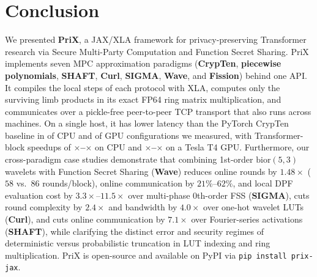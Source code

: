 \documentclass[11pt]{article}
\begin{document}
\section{Conclusion}
\label{sec:conclusion}

We presented \textbf{PriX}, a JAX/XLA framework for privacy-preserving Transformer research via Secure Multi-Party Computation and Function Secret Sharing. PriX implements seven MPC approximation paradigms (\textbf{CrypTen}, \textbf{piecewise polynomials}, \textbf{SHAFT}, \textbf{Curl}, \textbf{SIGMA}, \textbf{Wave}, and \textbf{Fission}) behind one API. It compiles the local steps of each protocol with XLA, computes only the surviving limb products in its exact FP64 ring matrix multiplication, and communicates over a pickle-free peer-to-peer TCP transport that also runs across machines. On a single host, it has lower latency than the PyTorch CrypTen baseline in \cpuNumFaster{} of \cpuNumConfigs{} CPU and \gpuNumFaster{} of \gpuNumConfigs{} GPU configurations we measured, with Transformer-block speedups of \textbf{\cpuLlmSpeedupMin$\times$--\cpuLlmSpeedupMax$\times$} on CPU and \textbf{\gpuLlmSpeedupMin$\times$--\gpuLlmSpeedupMax$\times$} on a Tesla T4 GPU. Furthermore, our cross-paradigm case studies demonstrate that combining 1st-order $\text{bior}(5,3)$ wavelets with Function Secret Sharing (\textbf{Wave}) reduces online rounds by $1.48\times$ ($58$ vs.\ $86$ rounds/block), online communication by $21\%$--$62\%$, and local DPF evaluation cost by $3.3\times$--$11.5\times$ over multi-phase 0th-order FSS (\textbf{SIGMA}), cuts round complexity by $2.4\times$ and bandwidth by $4.0\times$ over one-hot wavelet LUTs (\textbf{Curl}), and cuts online communication by $7.1\times$ over Fourier-series activations (\textbf{SHAFT}), while clarifying the distinct error and security regimes of deterministic versus probabilistic truncation in LUT indexing and ring multiplication. PriX is open-source and available on PyPI via \texttt{pip install prix-jax}.



\end{document}
